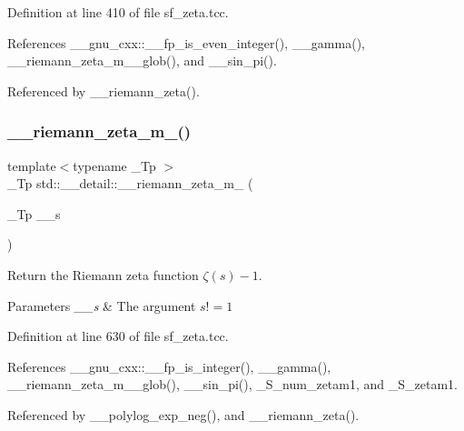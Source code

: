 Definition at line 410 of file sf\+\_\+zeta.\+tcc.



References \+\_\+\+\_\+gnu\+\_\+cxx\+::\+\_\+\+\_\+fp\+\_\+is\+\_\+even\+\_\+integer(), \+\_\+\+\_\+gamma(), \+\_\+\+\_\+riemann\+\_\+zeta\+\_\+m\+\_\+\_\+glob(), and \+\_\+\+\_\+sin\+\_\+pi().



Referenced by \+\_\+\+\_\+riemann\+\_\+zeta().

\mbox{\label{namespacestd_1_1____detail_a174bfa28eeb176b90ff251b5affbecb2}} 
\subsubsection{\texorpdfstring{\+\_\+\+\_\+riemann\+\_\+zeta\+\_\+m\+\_()}{\_\_riemann\_zeta\_m\_1()}}
{\footnotesize\ttfamily template$<$typename \+\_\+\+Tp $>$ \\
\+\_\+\+Tp std\+::\+\_\+\+\_\+detail\+::\+\_\+\+\_\+riemann\+\_\+zeta\+\_\+m\+\_ (\begin{DoxyParamCaption}\item[{\+\_\+\+Tp}]{\+\_\+\+\_\+s }\end{DoxyParamCaption})}



Return the Riemann zeta function $ \zeta(s) - 1 $. 


\begin{DoxyParams}{Parameters}
{\em \+\_\+\+\_\+s} & The argument $ s != 1 $ \\
\hline
\end{DoxyParams}


Definition at line 630 of file sf\+\_\+zeta.\+tcc.



References \+\_\+\+\_\+gnu\+\_\+cxx\+::\+\_\+\+\_\+fp\+\_\+is\+\_\+integer(), \+\_\+\+\_\+gamma(), \+\_\+\+\_\+riemann\+\_\+zeta\+\_\+m\+\_\+\_\+glob(), \+\_\+\+\_\+sin\+\_\+pi(), \+\_\+\+S\+\_\+num\+\_\+zetam1, and \+\_\+\+S\+\_\+zetam1.



Referenced by \+\_\+\+\_\+polylog\+\_\+exp\+\_\+neg(), and \+\_\+\+\_\+riemann\+\_\+zeta().


